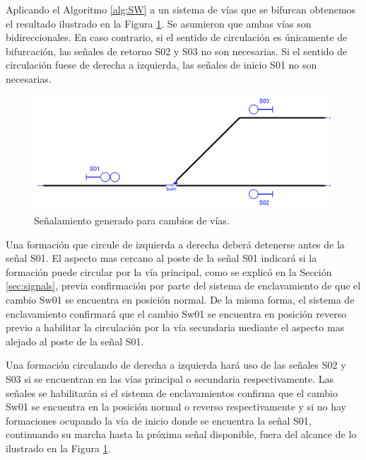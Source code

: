     Aplicando el Algoritmo \ref{alg:SW} a un sistema de vías que se bifurcan obtenemos el resultado ilustrado en la Figura \ref{fig:signal_swithces}. Se asumieron que ambas vías son bidireccionales. En caso contrario, si el sentido de circulación es únicamente de bifurcación, las señales de retorno S02 y S03 no son necesarias. Si el sentido de circulación fuese de derecha a izquierda, las señales de inicio S01 no son necesarias.
    
    \begin{figure}[h!]
        \centering
        \includegraphics[width=1\textwidth]{Figuras/switches.PNG}
        \centering\caption{Señalamiento generado para cambios de vías.}
        \label{fig:signal_swithces}
    \end{figure}
    
    Una formación que circule de izquierda a derecha deberá detenerse antes de la señal S01. El aspecto mas cercano al poste de la señal S01 indicará si la formación puede circular por la vía principal, como se explicó en la Sección \ref{sec:signals}, previa confirmación por parte del sistema de enclavamiento de que el cambio Sw01 se encuentra en posición normal. De la misma forma, el sistema de enclavamiento confirmará que el cambio Sw01 se encuentra en posición reverso previo a habilitar la circulación por la vía secundaria mediante el aspecto mas alejado al poste de la señal S01.

    Una formación circulando de derecha a izquierda hará uso de las señales S02 y S03 si se encuentran en las vías principal o secundaria respectivamente. Las señales se habilitarán si el sistema de enclavamientos confirma que el cambio Sw01 se encuentra en la posición normal o reverso respectivamente y si no hay formaciones ocupando la vía de inicio donde se encuentra la señal S01, continuando su marcha hasta la próxima señal disponible, fuera del alcance de lo ilustrado en la Figura \ref{fig:signal_swithces}.    